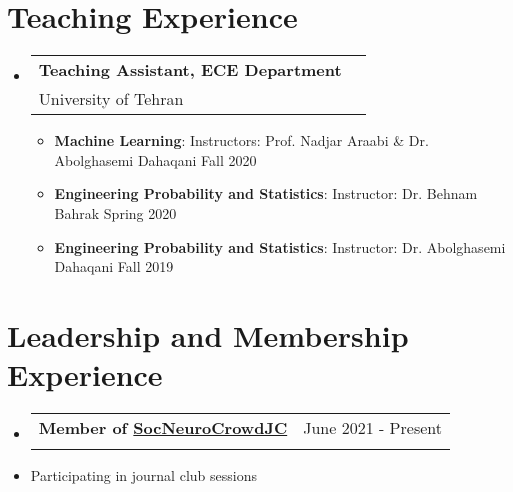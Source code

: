 \documentclass[a4paper,10pt]{article}
\makeatletter
\newcommand{\resumeItem}[2]{
  \item{
    \textbf{#1}{: #2}
  }
}
\newcommand{\resumeSubheading}[4]{
  \item
    \begin{tabular*}{0.98\textwidth}[t]{l@{\extracolsep{\fill}}r}
      \textbf{#1} & #2 \\
      #3 & #4 \\
    \end{tabular*}
}
\newcommand{\resumeSubHeadingListStart}{\begin{itemize}[leftmargin=*]}
\newcommand{\resumeSubHeadingListEnd}{\end{itemize}}
\newcommand{\resumeItemListStart}{\begin{itemize}\vspace{-4pt}}
\newcommand{\resumeItemListEnd}{\end{itemize}}
\makeatother
\begin{document}



\section{Teaching Experience}
  \resumeSubHeadingListStart
      
    \resumeSubheading
      {Teaching Assistant, ECE Department}{}
      {University of Tehran}{}
      \resumeItemListStart
      	\resumeItem{Machine Learning}{Instructors: Prof. Nadjar Araabi \& Dr. Abolghasemi Dahaqani \hfill Fall 2020}
       	\resumeItem{Engineering Probability and Statistics}{Instructor: Dr. Behnam Bahrak \hfill Spring 2020}
       	\resumeItem{Engineering Probability and Statistics}{Instructor: Dr. Abolghasemi Dahaqani \hfill Fall 2019}
      \resumeItemListEnd


    
  \resumeSubHeadingListEnd

\section{Leadership and Membership Experience}
\resumeSubHeadingListStart



\resumeSubheading
{Member of \href{https://crowdcognition.net/journalclub/}{SocNeuroCrowdJC}}
{June 2021 - Present}{}

\resumeItemListStart
\vspace{-0.35cm} 
\item Participating in journal club sessions  %
\resumeItemListEnd
\end{document}
